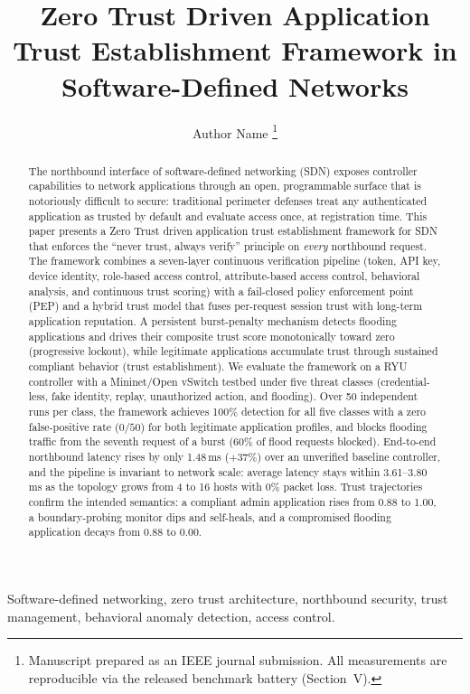 \documentclass[journal]{IEEEtran}
\title{Zero Trust Driven Application Trust Establishment Framework in Software-Defined Networks}
\author{Author Name%
\thanks{Manuscript prepared as an IEEE journal submission. All measurements are reproducible via the released benchmark battery (Section~V).}}
\begin{document}
\maketitle

\begin{abstract}
The northbound interface of software-defined networking (SDN) exposes controller capabilities to network applications through an open, programmable surface that is notoriously difficult to secure: traditional perimeter defenses treat any authenticated application as trusted by default and evaluate access once, at registration time. This paper presents a Zero Trust driven application trust establishment framework for SDN that enforces the ``never trust, always verify'' principle on \emph{every} northbound request. The framework combines a seven-layer continuous verification pipeline (token, API key, device identity, role-based access control, attribute-based access control, behavioral analysis, and continuous trust scoring) with a fail-closed policy enforcement point (PEP) and a hybrid trust model that fuses per-request session trust with long-term application reputation. A persistent burst-penalty mechanism detects flooding applications and drives their composite trust score monotonically toward zero (progressive lockout), while legitimate applications accumulate trust through sustained compliant behavior (trust establishment). We evaluate the framework on a RYU controller with a Mininet/Open vSwitch testbed under five threat classes (credential-less, fake identity, replay, unauthorized action, and flooding). Over 50 independent runs per class, the framework achieves 100\% detection for all five classes with a zero false-positive rate ($0/50$) for both legitimate application profiles, and blocks flooding traffic from the seventh request of a burst (60\% of flood requests blocked). End-to-end northbound latency rises by only 1.48\,ms ($+37\%$) over an unverified baseline controller, and the pipeline is invariant to network scale: average latency stays within 3.61--3.80\,ms as the topology grows from 4 to 16 hosts with 0\% packet loss. Trust trajectories confirm the intended semantics: a compliant admin application rises from 0.88 to 1.00, a boundary-probing monitor dips and self-heals, and a compromised flooding application decays from 0.88 to 0.00.
\end{abstract}

\begin{IEEEkeywords}
Software-defined networking, zero trust architecture, northbound security, trust management, behavioral anomaly detection, access control.
\end{IEEEkeywords}
\end{document}
